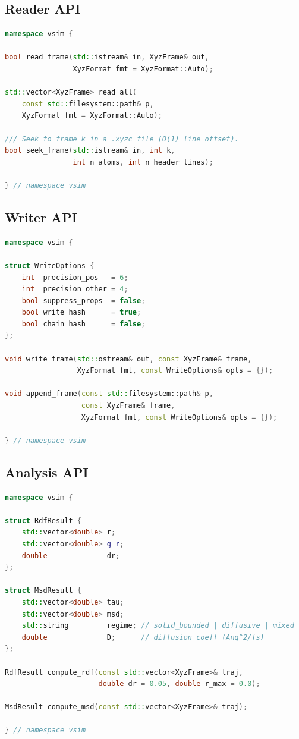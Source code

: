 \documentclass[11pt, a4paper, oneside]{article}
\begin{document}
\subsection{Reader API}

\begin{lstlisting}[language=C++, caption={XYZ reader API.}]
namespace vsim {

bool read_frame(std::istream& in, XyzFrame& out,
                XyzFormat fmt = XyzFormat::Auto);

std::vector<XyzFrame> read_all(
    const std::filesystem::path& p,
    XyzFormat fmt = XyzFormat::Auto);

/// Seek to frame k in a .xyzc file (O(1) line offset).
bool seek_frame(std::istream& in, int k,
                int n_atoms, int n_header_lines);

} // namespace vsim
\end{lstlisting}

\subsection{Writer API}

\begin{lstlisting}[language=C++, caption={XYZ writer API.}]
namespace vsim {

struct WriteOptions {
    int  precision_pos   = 6;
    int  precision_other = 4;
    bool suppress_props  = false;
    bool write_hash      = true;
    bool chain_hash      = false;
};

void write_frame(std::ostream& out, const XyzFrame& frame,
                 XyzFormat fmt, const WriteOptions& opts = {});

void append_frame(const std::filesystem::path& p,
                  const XyzFrame& frame,
                  XyzFormat fmt, const WriteOptions& opts = {});

} // namespace vsim
\end{lstlisting}

\subsection{Analysis API}

\begin{lstlisting}[language=C++, caption={Trajectory analysis API (traj\_analysis.hpp).}]
namespace vsim {

struct RdfResult {
    std::vector<double> r;
    std::vector<double> g_r;
    double              dr;
};

struct MsdResult {
    std::vector<double> tau;
    std::vector<double> msd;
    std::string         regime; // solid_bounded | diffusive | mixed
    double              D;      // diffusion coeff (Ang^2/fs)
};

RdfResult compute_rdf(const std::vector<XyzFrame>& traj,
                      double dr = 0.05, double r_max = 0.0);

MsdResult compute_msd(const std::vector<XyzFrame>& traj);

} // namespace vsim
\end{lstlisting}
\end{document}
